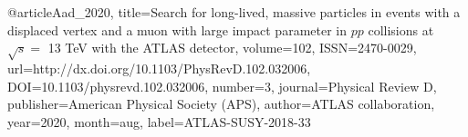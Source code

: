 @article{Aad_2020, 
    title={Search for long-lived, massive particles in events with a displaced vertex and a muon with large impact parameter in $pp$ collisions at $\sqrt{s}=$ 13 TeV with the ATLAS detector}, 
    volume={102}, 
    ISSN={2470-0029}, 
    url={http://dx.doi.org/10.1103/PhysRevD.102.032006}, 
    DOI={10.1103/physrevd.102.032006}, 
    number={3}, 
    journal={Physical Review D}, 
    publisher={American Physical Society (APS)}, 
    author={ATLAS collaboration}, 
    year={2020}, 
    month=aug,
    label={ATLAS-SUSY-2018-33}
}

